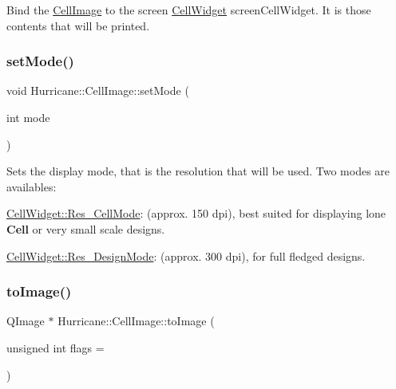 Bind the \mbox{\hyperlink{classHurricane_1_1CellImage}{Cell\+Image}} to the screen \mbox{\hyperlink{classHurricane_1_1CellWidget}{Cell\+Widget}} {\ttfamily screen\+Cell\+Widget}. It is those contents that will be printed. \mbox{\label{classHurricane_1_1CellImage_aefcd1a8382907eaf13b6aeeaae0c3a6e}} 
\subsubsection{\texorpdfstring{set\+Mode()}{setMode()}}
{\footnotesize\ttfamily void Hurricane\+::\+Cell\+Image\+::set\+Mode (\begin{DoxyParamCaption}\item[{int}]{mode }\end{DoxyParamCaption})\hspace{0.3cm}{\ttfamily [inline]}}

Sets the display mode, that is the resolution that will be used. Two modes are availables\+: 
\begin{DoxyItemize}
\item \mbox{\hyperlink{classHurricane_1_1CellWidget_a4b81fed78775d491c169b649870d9dd7af37fd1c10fd363f0ad04a94dbccd5789}{Cell\+Widget\+::\+Res\+\_\+\+Cell\+Mode}}\+: (approx. 150 dpi), best suited for displaying lone \textbf{ Cell} or very small scale designs. 
\item \mbox{\hyperlink{classHurricane_1_1CellWidget_a4b81fed78775d491c169b649870d9dd7a0c7c9bd939930fe178b5b8bcd84bdc1e}{Cell\+Widget\+::\+Res\+\_\+\+Design\+Mode}}\+: (approx. 300 dpi), for full fledged designs. 
\end{DoxyItemize}\mbox{\label{classHurricane_1_1CellImage_a90ed9b8a07f4302cbeecf52a95ef5578}} 
\subsubsection{\texorpdfstring{to\+Image()}{toImage()}}
{\footnotesize\ttfamily Q\+Image $\ast$ Hurricane\+::\+Cell\+Image\+::to\+Image (\begin{DoxyParamCaption}\item[{unsigned int}]{flags = {} }\end{DoxyParamCaption})}


